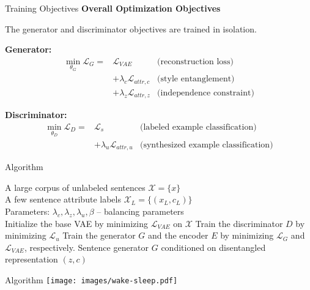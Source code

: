 \documentclass{beamer}
\begin{document}
\begin{frame}{Training Objectives}
  \textbf{Overall Optimization Objectives}
  
  The generator and discriminator objectives are trained in isolation.

  \textbf{Generator:}
  \begin{eqnarray*}
    \operatorname*{min}_{\theta_G} \mathcal{L}_G =
      & \mathcal{L}_{VAE} & \text{(reconstruction loss)} \\ 
      & + \lambda_c \mathcal{L}_{attr,c} & \text{(style entanglement)} \\ 
      & + \lambda_z \mathcal{L}_{attr,z} & \text{(independence constraint)}
  \end{eqnarray*}

  \textbf{Discriminator:}
  \begin{eqnarray*}
    \operatorname*{min}_{\theta_D} \mathcal{L}_D =
      & \mathcal{L}_{s} & \text{(labeled example classification)} \\
      & + \lambda_u \mathcal{L}_{attr,u} & \text{(synthesized example classification)}
  \end{eqnarray*}
\end{frame}

\begin{frame}{Algorithm}
\begin{algorithm}[H]
  \centering
  \begin{algorithmic}[1]
  \REQUIRE A large corpus of unlabeled sentences $\mathcal{X}=\{x\}$ \\
  \quad A few sentence attribute labels $\mathcal{X}_L = \{(x_L,c_L)\}$ \\
  \quad Parameters: $\lambda_c, \lambda_z, \lambda_u, \beta$  -- balancing parameters \\
  \STATE Initialize the base VAE by minimizing $\mathcal{L}_{VAE}$ on $\mathcal{X}$
  \REPEAT
      \STATE Train the discriminator $D$ by minimizing $\mathcal{L}_u$
      \STATE Train the generator $G$ and the encoder $E$ by minimizing $\mathcal{L}_G$ and $\mathcal{L}_{VAE}$, respectively.
  \ENSURE Sentence generator $G$ conditioned on disentangled representation $(z,c)$
  \end{algorithmic}
  \end{algorithm}
\end{frame}

\begin{frame}{Algorithm}
  \centering
  \texttt{[image: images/wake-sleep.pdf]}
\end{frame}
\end{document}
